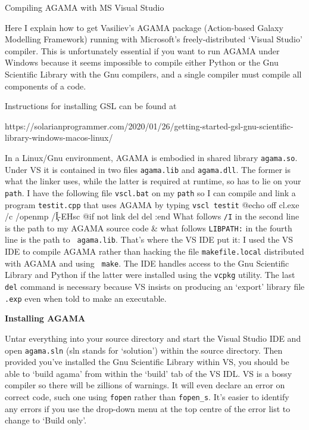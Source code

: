  \reportformat
\centerline{\titlefont Compiling AGAMA with MS Visual Studio}

\bigskip\noindent
Here I explain how to get Vasiliev's  AGAMA package (Action-based  Galaxy
Modelling Framework) running with Microsoft's freely-distributed `Visual Studio'
compiler. This is unfortunately essential if you want to run AGAMA under
Windows because it seems impossible to compile either Python or the Gnu
Scientific Library with the Gnu compilers, and a single compiler must compile all
components of a code.

Instructions for installing GSL can be found at

\noindent https://solarianprogrammer.com/2020/01/26/getting-started-gsl-gnu-scientific-library-windows-macos-linux/

In a Linux/Gnu environment, AGAMA is embodied in shared library {\tt agama.so}. Under
VS it is contained in two files {\tt agama.lib} and {\tt agama.dll}. The former is
what the linker uses, while the latter is required at runtime, so has to lie
on your {\tt path}. I have the following file {\tt vscl.bat} on my {\tt path}
so I can compile and link a program {\tt testit.cpp} that uses AGAMA by
typing {\tt vscl testit}
\begintt
@echo off
cl.exe /c /openmp /I\u\c\agama\agama -EHsc %
@if not %
link %
del %
del %
:end
\endtt
What follows {\tt /I} in the second line is the path to
my AGAMA source code \& what follows {\tt LIBPATH:} in the fourth line is the path to {\tt
agama.lib}. That's where the VS IDE put it: I used the VS IDE to compile AGAMA
rather than hacking the file {\tt makefile.local} distributed with AGAMA and using {\tt
make}. The IDE handles access to the Gnu Scientific Library and Python if the latter were
installed using the {\tt vcpkg} utility.
The last {\tt del} command is necessary because VS insists on producing an
`export' library file {\tt.exp} even when told to
make an executable. 

\bigskip\centerline{\bf Installing AGAMA}

\noindent  Untar everything into your source directory and start the Visual Studio IDE and open {\tt agama.sln} (sln stands for `solution') within the
source directory. Then provided you've installed the Gnu Scientific Library within VS, you
should be able to `build agama' from within the `build' tab of the VS IDL. VS is a bossy
compiler so there will be zillions of warnings. It will even declare an error on correct
code, such one using {\tt fopen} rather than {\tt fopen\_s}.  It's easier to identify any
errors if you use the drop-down menu at the top centre of the error list to change to
`Build only'. 

